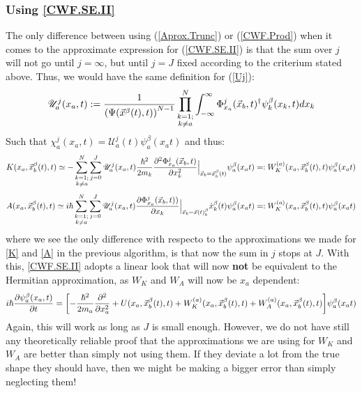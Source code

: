 \documentclass[11pt, a4paper]{article} %
\newcommand{\U}{\mathscr{U}}
\begin{document}
\subsubsection{Using \ref{CWF.SE.II}}
The only difference between using (\ref{Aprox.Trunc}) or (\ref{CWF.Prod}) when it comes to the approximate expression for (\ref{CWF.SE.II}) is that the sum over $j$ will not go until $j=\infty$, but until $j=J$ fixed according to the criterium stated above. Thus, we would have the same definition for (\ref{Uj}):
$$
\U^j_a(x_a, t):=\frac{1}{ \qty(\Psi(\vec{x}^\beta(t),t))^{N-1}}\prod_{\substack{k=1; \\ k\neq a}}^{N} \int_{-\infty}^\infty \Phi_{x_a}^j(\vec{x}_b,t)^\dagger \psi^\beta_k(x_k,t) dx_k 
$$
Such that $\chi_a^j(x_a,t)= \U^j_a(t)\psi_a^\beta(x_a t)$ and thus:
$$
K(x_a, \vec{x}_b^\beta(t), t) \simeq - \sum_{\substack{k=1; \\ k\neq a}}^{N} \sum_{j=0}^J \U^j_a(x_a,t) \frac{\hbar^2}{2m_k} \pdv[2]{ \Phi_{x_a}^j(\vec{x}_b,t)}{x_k}\Big\rvert_{\vec{x}_b=\vec{x}_b^\beta(t)}\psi_a^\beta(x_a t)=:W_K^{(a)}(x_a, \vec{x}_b^\beta (t),t)\psi_a^\beta(x_a t)
$$
$$
A(x_a, \vec{x}_b^\beta(t), t) \simeq i \hbar \sum_{\substack{k=1; \\ k\neq a}}^{N} \sum_{j=0}^J \U^j_a(x_a,t) \pdv{ \Phi_{x_a}^j(\vec{x}_b,t))}{x_k}\Big\rvert_{\vec{x}_b=\vec{x}(t)_b^\beta} \dot{x}_k^\beta(t)\psi_a^\beta(x_a t)=:W_K^{(a)}(x_a, \vec{x}_b^\beta (t),t)\psi_a^\beta(x_a t)
$$
where we see the only difference with respecto to the approximations we made for \ref{K} and \ref{A} in the previous algorithm, is that now the sum in $j$ stops at $J$. With this, \ref{CWF.SE.II} adopts a linear look that will now {\bf not} be equivalent to the Hermitian approximation, as $W_K$ and $W_A$ will now be $x_a$ dependent:
$$
i\hbar \pdv{\psi_a^\beta(x_a, t)}{t} = \qty[- \frac{\hbar^2}{2m_a}\pdv[2]{}{x_a} + U(x_a, \vec{x}_b^\beta(t), t)+ W^{(a)}_K(x_a,\vec{x}_b^\beta (t),t) +W^{(a)}_A(x_a,\vec{x}_b^\beta (t),t) ]\psi_a^\beta(x_a t)
$$
Again, this will work as long as $J$ is small enough. However, we do not have still any theoretically reliable proof that the approximations we are using for $W_K$ and $W_A$ are better than simply not using them. If they deviate a lot from the true shape they should have, then we might be making a bigger error than simply neglecting them!
\end{document}
